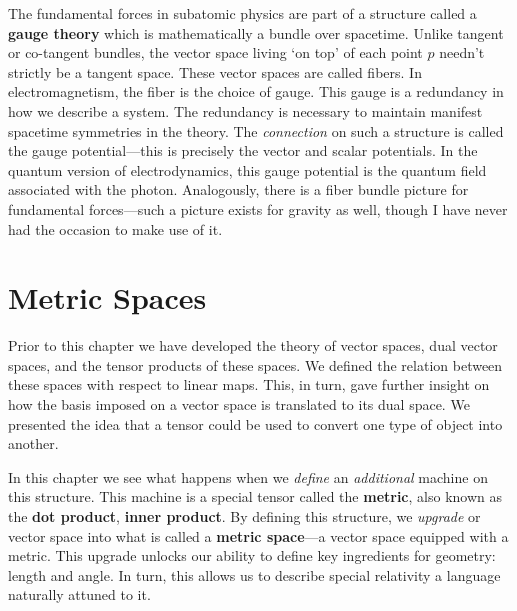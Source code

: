\documentclass[12pt, oneside]{report}    %
\begin{document}
The fundamental forces in subatomic physics are part of a structure called a \textbf{gauge theory } which is mathematically a bundle over spacetime. Unlike tangent or co-tangent bundles, the vector space living `on top' of each point $p$ needn't strictly be a tangent space. These vector spaces are called fibers. In electromagnetism, the fiber is the choice of gauge. This gauge is a redundancy in how we describe a system. The redundancy is necessary to maintain manifest spacetime symmetries in the theory. The \emph{connection} on such a structure is called the gauge potential---this is precisely the vector and scalar potentials. In the quantum version of electrodynamics, this gauge potential is the quantum field associated with the photon. Analogously, there is a fiber bundle picture for fundamental forces---such a picture exists for gravity as well, though I have never had the occasion to make use of it. 



\chapter{Metric Spaces}\label{ch:metric:spaces}

Prior to this chapter we have developed the theory of vector spaces, dual vector spaces, and the tensor products of these spaces. We defined the relation between these spaces with respect to linear maps. This, in turn, gave further insight on how the basis imposed on a vector space is translated to its dual space. We presented the idea that a tensor could be used to convert one type of object into another. 

In this chapter we see what happens when we \emph{define} an \emph{additional} machine on this structure. This machine is a special tensor called the \textbf{metric}, also known as the \textbf{dot product}, \textbf{inner product}. By defining this structure, we \emph{upgrade} or vector space into what is called a \textbf{metric space}---a vector space equipped with a metric. This upgrade unlocks our ability to define key ingredients for geometry: length and angle. In turn, this allows us to describe special relativity a language naturally attuned to it.
\end{document}
